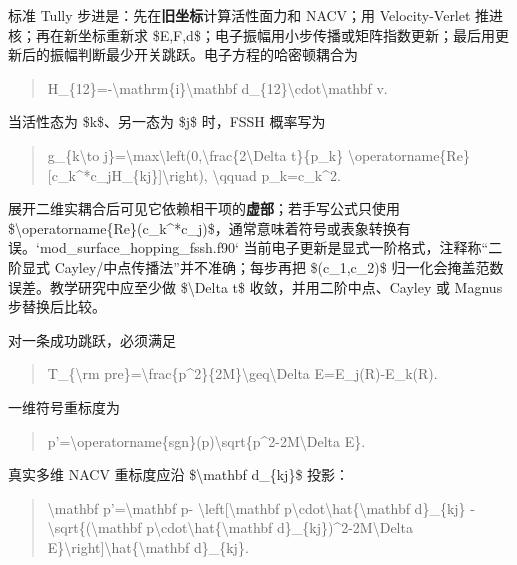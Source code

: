 \documentclass[UTF8,openany,11pt,fontset=fandol]{ctexbook}
\begin{document}
标准 Tully 步进是：先在\textbf{旧坐标}计算活性面力和 NACV；用
Velocity-Verlet 推进核；再在新坐标重新求
\$E,F,d\$；电子振幅用小步传播或矩阵指数更新；最后用更新后的振幅判断最少开关跳跃。电子方程的哈密顿耦合为

\begin{quote}
H\_\{12\}=-\textbackslash mathrm\{i\}\textbackslash mathbf
d\_\{12\}\textbackslash cdot\textbackslash mathbf v.
\end{quote}

当活性态为 \$k\$、另一态为 \$j\$ 时，FSSH 概率写为

\begin{quote}
g\_\{k\textbackslash to
j\}=\textbackslash max\textbackslash left(0,\textbackslash frac\{2\textbackslash Delta
t\}\{p\_k\}
\textbackslash operatorname\{Re\}{[}c\_k\^{}*c\_jH\_\{kj\}{]}\textbackslash right),
\textbackslash qquad p\_k=\textbar c\_k\textbar\^{}2.
\end{quote}

展开二维实耦合后可见它依赖相干项的\textbf{虚部}；若手写公式只使用
\$\textbackslash operatorname\{Re\}(c\_k\^{}*c\_j)\$，通常意味着符号或表象转换有误。`mod\_surface\_hopping\_fssh.f90`
当前电子更新是显式一阶格式，注释称``二阶显式
Cayley/中点传播法''并不准确；每步再把 \$(c\_1,c\_2)\$
归一化会掩盖范数误差。教学研究中应至少做 \$\textbackslash Delta t\$
收敛，并用二阶中点、Cayley 或 Magnus 步替换后比较。

对一条成功跳跃，必须满足

\begin{quote}
T\_\{\textbackslash rm
pre\}=\textbackslash frac\{p\^{}2\}\{2M\}\textbackslash geq\textbackslash Delta
E=E\_j(R)-E\_k(R).
\end{quote}

一维符号重标度为

\begin{quote}
p'=\textbackslash operatorname\{sgn\}(p)\textbackslash sqrt\{p\^{}2-2M\textbackslash Delta
E\}.
\end{quote}

真实多维 NACV 重标度应沿 \$\textbackslash mathbf d\_\{kj\}\$ 投影：

\begin{quote}
\textbackslash mathbf p'=\textbackslash mathbf p-
\textbackslash left{[}\textbackslash mathbf
p\textbackslash cdot\textbackslash hat\{\textbackslash mathbf
d\}\_\{kj\} -\textbackslash sqrt\{(\textbackslash mathbf
p\textbackslash cdot\textbackslash hat\{\textbackslash mathbf
d\}\_\{kj\})\^{}2-2M\textbackslash Delta
E\}\textbackslash right{]}\textbackslash hat\{\textbackslash mathbf
d\}\_\{kj\}.
\end{quote}
\end{document}
